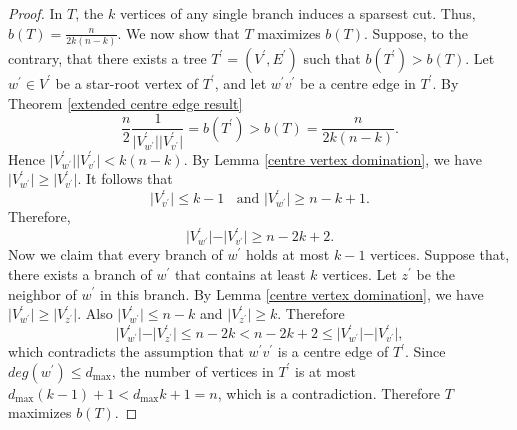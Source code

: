 \documentclass[10pt,a4paper]{amsart}
\begin{document}
\begin{proof}



In $T$, the $k$ vertices of any single branch induces a sparsest cut. Thus, $b(T)=\frac{n}{2k(n-k)}$. We now show that $T$ maximizes $b(T)$. Suppose, to the contrary, that there exists a tree  $T^\prime=(V^\prime,E^\prime)$ such that $b(T^\prime)>b(T)$. Let $w^\prime \in V^\prime$ be a star-root vertex of $T^\prime$, and let $w^\prime v^\prime$ be a centre edge in $T^\prime$. By Theorem \ref{extended centre edge result}
$$
 \frac{n}{2}\frac{1}{\vert V^\prime_{w^\prime}\vert \vert V^\prime_{v^\prime}\vert}=b(T^\prime)>b(T)=\frac{n}{2k(n-k)}.
 $$
Hence $\vert V^\prime_{w^\prime}\vert \vert V^\prime_{v^\prime}\vert < k(n-k)$. By Lemma \ref{centre vertex domination}, we have $\vert V^\prime_{w^\prime}\vert \geq \vert V^\prime_{v^\prime}\vert$. It follows that $$\vert V^\prime_{v^\prime}\vert \leq k-1~\mbox{~ and~} \vert V^\prime_{w^\prime} \vert \geq n-k+1.$$ Therefore, $$\vert V^\prime_{w^\prime} \vert - \vert V^\prime_{v^\prime}\vert \geq n-2k+2.$$
Now we claim that every branch of $w^\prime$ holds at most $k-1$ vertices. Suppose that, there exists a branch of $w^\prime$ that contains at least $k$ vertices. Let $z^\prime$ be the neighbor of $w^\prime$ in this branch. By Lemma \ref{centre vertex domination}, we have $\vert V^\prime_{w^\prime}\vert \geq \vert V^\prime_{z^\prime} \vert$. Also  $\vert V^\prime_{w^\prime}\vert \leq n-k$ and $\vert V^\prime_{z^\prime}\vert \geq k$. Therefore $$\vert V^\prime_{w^\prime}\vert-\vert V^\prime_{z^\prime}\vert \leq n-2k <n-2k+2 \leq \vert V^\prime_{w^\prime} \vert - \vert V^\prime_{v^\prime}\vert,$$
which contradicts the assumption that $w^\prime v^\prime$ is a centre edge of $T^\prime$.
Since $deg(w^\prime) \leq d_{\max}$, the number of vertices in $T^\prime$ is at most $d_{\max}(k-1)+1 <d_{\max}k+1=n$, which is a contradiction. Therefore $T$ maximizes $b(T)$.


\end{proof}
\end{document}
